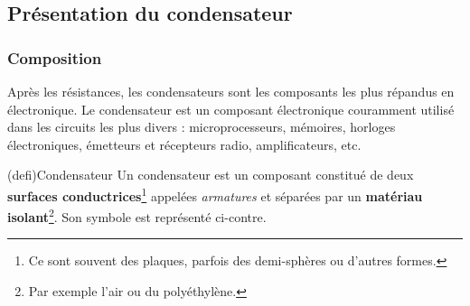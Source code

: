 \documentclass[../../main/main.tex]{subfiles}
\begin{document}
\subsection{Présentation du condensateur}
\subsubsection{Composition}

Après les résistances, les condensateurs sont les composants les plus répandus
en électronique. Le condensateur est un composant électronique couramment
utilisé dans les circuits les plus divers : microprocesseurs, mémoires, horloges
électroniques, émetteurs et récepteurs radio, amplificateurs, etc.

\begin{tcb}[label=def:condens, sidebyside, righthand ratio=.3](defi){Condensateur}
	Un condensateur est un composant constitué de deux \textbf{surfaces
		conductrices}\footnote{Ce sont souvent des plaques, parfois des demi-sphères
		ou d'autres formes.} appelées \textit{armatures} et séparées par un
	\textbf{matériau isolant}\footnote{Par exemple l'air ou du polyéthylène.}.
	Son symbole est représenté ci-contre.
	\tcblower
	\begin{center}
	\end{center}
\end{tcb}
\end{document}
